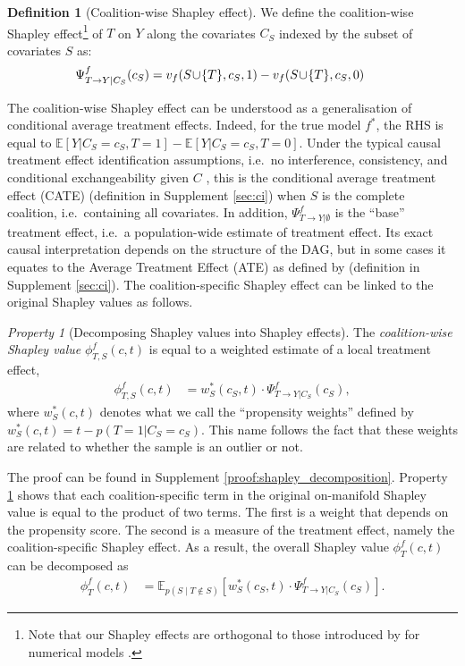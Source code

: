 \documentclass{article}
\theoremstyle{plain}
\theoremstyle{definition}
\newtheorem{definition}[theorem]{Definition}
\theoremstyle{remark}
\newcommand{\effect}{\Psi}
\theoremstyle{mystyle}
\newtheorem{property}{Property}[section]
\newcommand{\coalitionshapley}[4]{\phi^{#1}_{#3,#2}(#4)}
\begin{document}
\begin{definition}[Coalition-wise Shapley effect] \label{def:coalition_shapley_values}
We define the coalition-wise Shapley effect\footnote{Note that our Shapley effects are orthogonal to those introduced by  for numerical models .} of $T$ on $Y$ along the covariates $C_S$ indexed by the subset of covariates $S$ as:
\begin{align*}
    &\effect^f_{ T \rightarrow Y | C_{S}}(c_S) = v_{f}(S \mkern-3mu \cup \mkern-3mu \{T\},c_S,1) - v_{f}(S \mkern-3mu \cup \mkern-3mu \{T\},c_S,0) &&
\end{align*}
\end{definition}
 The coalition-wise Shapley effect can be understood as a generalisation of conditional average treatment effects. Indeed, for the true model $f^*$, the RHS is equal to $\mathbb{E}[Y|C_S = c_S, T=1] - \mathbb{E}[Y|C_S = c_S, T=0]$.
Under the typical causal treatment effect identification assumptions, i.e.\  no interference, consistency, and conditional exchangeability given $C$  , this is the conditional average treatment effect (CATE)  (definition in Supplement \ref{sec:ci}) when $S$ is the complete coalition, i.e.\ containing all covariates. In addition, $\effect^f_{ T \rightarrow Y |{\emptyset}}$ is the ``base'' treatment effect, i.e.\ a population-wide estimate of treatment effect. Its exact causal interpretation depends on the structure of the DAG, but in some cases it equates to the Average Treatment Effect (ATE) as defined by  (definition in Supplement \ref{sec:ci}).
The coalition-specific Shapley effect can be linked to the original Shapley values as follows.
\begin{property}[Decomposing Shapley values into Shapley effects]  \label{prop:shapley_decomposition}
The \textit{coalition-wise Shapley value} $\coalitionshapley{f}{S}{T}{c,t}$ is equal to a weighted estimate of a local treatment effect, 
\begin{align}
    \coalitionshapley{f}{S}{T}{c,t} &= w^*_{S}(c_S,t) \cdot \effect^f_{ T \rightarrow Y | C_{S}}(c_S), 
\end{align}
where $w^*_{S}(c,t)$ denotes what we call the ``propensity weights'' defined by 
$w^*_{S}(c,t) = t - p(T=1|C_S=c_S)$. This name follows the fact that these weights are related to whether the sample is an outlier or not.

The proof can be found in Supplement \ref{proof:shapley_decomposition}.
Property \ref{prop:shapley_decomposition} shows that each coalition-specific term in the original on-manifold Shapley value is equal to the product of two terms. The first is a weight that depends on the propensity score. The second is a measure of the treatment effect, namely the coalition-specific Shapley effect. As a result, the overall Shapley value $\phi_T^f(c,t)$ can be decomposed as 
\begin{align*}
    \phi_T^f(c,t) &= \mathbb{E}_{p(S \mid T \notin S)} [w^*_{S}(c_S,t) \cdot \effect^f_{ T \rightarrow Y | C_{S}}(c_S) ].
\end{align*}
\end{property}
\end{document}
